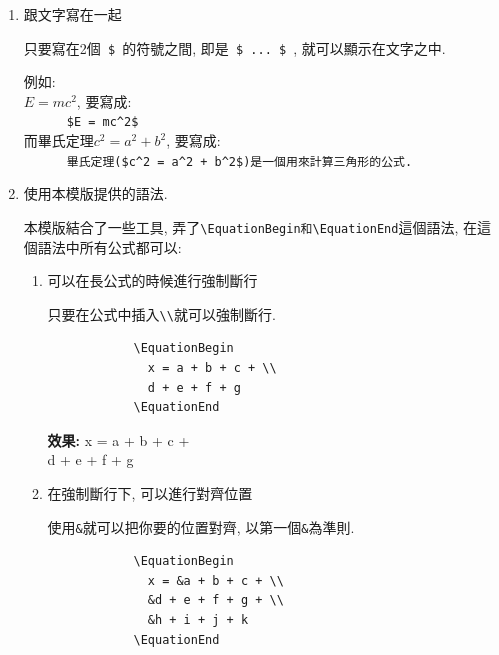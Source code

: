   \begin{enumerate}
    \item
    {
      跟文字寫在一起

      只要寫在2個\verb| $ |的符號之間, 即是\verb| $ ... $ |, 就可以顯示在文字之中.

      \noindent 例如:\\
      $E = mc^2$, 要寫成:\\
      \verb|      $E = mc^2$|\\
      而畢氏定理$c^2 = a^2 + b^2$, 要寫成:\\
      \verb|      畢氏定理($c^2 = a^2 + b^2$)是一個用來計算三角形的公式.|
    } %

    \newpage
    \item
    {
      使用本模版提供的語法.

      本模版結合了一些工具, 弄了\verb|\EquationBegin和\EquationEnd|這個語法, 在這個語法中所有公式都可以:
      \begin{enumerate}
        \item
        {
          可以在長公式的時候進行強制斷行

          只要在公式中插入\verb|\\|就可以強制斷行.
          \begin{verbatim}
            \EquationBegin
              x = a + b + c + \\
              d + e + f + g
            \EquationEnd
          \end{verbatim}

          {\bf 效果:}
          \EquationBegin
            x = a + b + c + \\
            d + e + f + g
          \EquationEnd
        } %

        \label{chapter:how-to:write:equation:label-example}
        \item
        {
          在強制斷行下, 可以進行對齊位置

          使用\verb|&|就可以把你要的位置對齊, 以第一個\verb|&|為準則.
          \begin{verbatim}
            \EquationBegin
              x = &a + b + c + \\
              &d + e + f + g + \\
              &h + i + j + k
            \EquationEnd
          \end{verbatim}

}
\end{enumerate}}
\end{enumerate}
